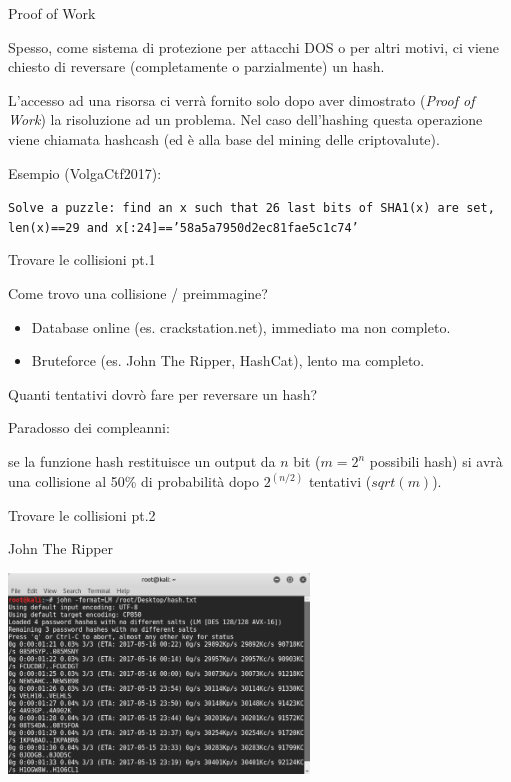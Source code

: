 \documentclass[xcolor=dvipsnames,aspectratio=169]{beamer}
\begin{document}
\begin{frame}{Proof of Work}
    \pause

    Spesso, come sistema di protezione per attacchi DOS o per altri motivi, ci viene chiesto di reversare (completamente o parzialmente) un hash.
    
    \pause \medskip
        
    L'accesso ad una risorsa ci verrà fornito solo dopo aver dimostrato (\textit{Proof of Work}) la risoluzione ad un problema.
    Nel caso dell'hashing questa operazione viene chiamata hashcash (ed è alla base del mining delle criptovalute).
    
    \medskip
    
    \pause

    Esempio (VolgaCtf2017):
    
    \texttt{Solve a puzzle: find an x such that 26 last bits of SHA1(x) are set, len(x)==29 and x[:24]=='58a5a7950d2ec81fae5c1c74'}
    
\end{frame}

\begin{frame}{Trovare le collisioni pt.1}

    Come trovo una collisione / preimmagine?
    
    \pause

    \begin{itemize}
      \item Database online (es. crackstation.net), immediato ma non completo.
      \item Bruteforce (es. John The Ripper, HashCat), lento ma completo.
    \end{itemize}
    
    \medskip
    \pause
    
    Quanti tentativi dovrò fare per reversare un hash?
    
    \pause
    \medskip
    
    Paradosso dei compleanni: 
    
    se la funzione hash restituisce un output da $n$ bit ($m = 2^n$ possibili hash) si avrà una collisione al 50\% di probabilità dopo $2^{(n/2)}$ tentativi ($sqrt(m)$).
    
\end{frame}

\begin{frame}{Trovare le collisioni pt.2}

    John The Ripper
    
    \medskip
    
    \centering\includegraphics[width=8cm]{img/john}
    
\end{frame}
    
\end{document}
